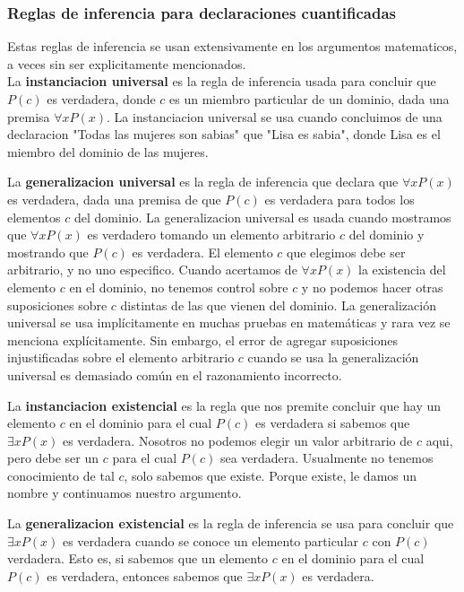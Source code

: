 \documentclass[]{article}
\begin{document}
\subsubsection*{Reglas de inferencia para declaraciones cuantificadas}

Estas reglas de inferencia se usan extensivamente en los argumentos matematicos, a veces sin ser explicitamente mencionados.\\

La \textbf{instanciacion universal} es la regla de inferencia usada para concluir que $P(c)$ es verdadera, donde $c$ es un miembro particular de un dominio, dada una premisa $\forall xP(x)$. La instanciacion universal se usa cuando concluimos de una declaracion "Todas las mujeres son sabias" que "Lisa es sabia", donde Lisa es el miembro del dominio de las mujeres.

La \textbf{generalizacion universal}  es la regla de inferencia que declara que $\forall xP(x)$ es verdadera, dada una premisa de que $P(c)$ es verdadera para todos los elementos $c$ del dominio. La generalizacion universal es usada cuando mostramos que $\forall x P(x)$ es verdadero tomando un elemento arbitrario $c$ del dominio y mostrando que $P(c)$ es verdadera. El elemento $c$ que elegimos debe ser arbitrario, y no uno especifico. Cuando acertamos de $\forall x P(x)$ la existencia del elemento $c$ en el dominio, no tenemos control sobre $c$ y no podemos hacer otras suposiciones sobre $c$ distintas de las que vienen del dominio. La generalización universal se usa implícitamente en muchas pruebas en matemáticas y rara vez se menciona explícitamente. Sin embargo, el error de agregar suposiciones injustificadas sobre el elemento arbitrario $c$ cuando se usa la generalización universal es demasiado común en el razonamiento incorrecto.

La \textbf{instanciacion existencial} es la regla que nos premite concluir que hay un elemento $c$ en el dominio para el cual $P(c)$ es verdadera si sabemos que $\exists x P(x)$ es verdadera. Nosotros no podemos elegir un valor arbitrario de $c$ aqui, pero debe ser un $c$ para el cual $P(c)$ sea verdadera. Usualmente no tenemos conocimiento de tal $c$, solo sabemos que existe. Porque existe, le damos un nombre y continuamos nuestro argumento.

La \textbf{generalizacion existencial} es la regla de inferencia se usa para concluir que $\exists x P(x)$ es verdadera cuando se conoce un elemento particular $c$ con $P(c)$ verdadera. Esto es, si sabemos que un elemento $c$ en el dominio para el cual $P(c)$ es verdadera, entonces sabemos que $\exists x P(x)$ es verdadera.
\end{document}
